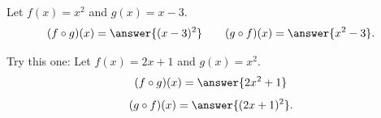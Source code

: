 \documentclass{ximera}
\begin{document}
\begin{example}\label{example:1-8}
Let $f(x)=x^{2}$ and $g(x)=x-3$.
\[
(f \circ g)(x) = \answer{(x-3)^{2}} \qquad (g \circ f)(x) = \answer{x^{2}-3}.
\]
\end{example}

\begin{exercise}\label{exercise:1-9}
Try this one:
Let $f(x)=2x+1$ and $g(x)=x^{2}$.
\[
(f \circ g)(x)= \answer{2x^{2}+1}
\]
\[
(g \circ f)(x)= \answer{(2x+1)^{2}}.
\]
\end{exercise}
\end{document}
